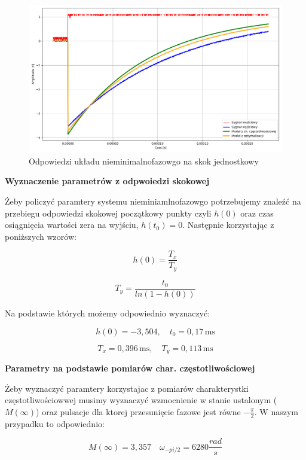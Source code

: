 \documentclass[12pt,a4paper]{article}
\begin{document}
	\begin{figure}[H]
		\centering
		\includegraphics[width=1\linewidth]{zdjecia/odp_skok_nmf.png}
		\caption{Odpowiedzi układu nieminimalnofazowgo na skok jednostkowy}
		\label{fig:skok_uk_nmf}
	\end{figure}
	
	\textbf{Wyznaczenie parametrów z odpwoiedzi skokowej}
	
	Żeby policzyć paramtery systemu nieminiamlnofazowgo potrzebujemy znaleźć na przebiegu odpowiedzi skokowej 
	początkowy punkty czyli $h(0)$ oraz czas osiągnięcia wartości zera na wyjściu, $h(t_0) = 0$. Następnie korzystając z poniższych wzorów:
	
	\begin{equation}
		h(0) = \frac{T_x}{T_y}
	\end{equation}
	
	\begin{equation}
		T_y = \frac{t_0}{ln(1-h(0))}
	\end{equation}
	
	\noindent Na podstawie których możemy odpowiednio wyznaczyć:
	
	\[
	h(0) = -3,504, \quad
	t_0 = 0{,}17\,\text{ms}
	\]
	
	\[
	T_x = 0{,}396\,\text{ms}, \quad
	T_y = 0{,}113\,\text{ms}
	\]
	
	
	\textbf{Parametry na podstawie pomiarów char. częstotliwościowej}
	
	Żeby wyznaczyć paramtery korzystajac z pomiarów charakterystki częstotliwościowwej musimy wyznaczyć
	wzmocnienie w stanie ustalonym ($M(\infty)$) oraz pulsacje dla ktorej przesunięcie fazowe jest równe 
	$-\frac{\pi}{2}$. W naszym przypadku to odpowiednio:
	
	\[
	M(\infty) = 3,357 \quad
	\omega_{-pi/2} = 6280\frac{rad}{s}
	\]
	
\end{document}
